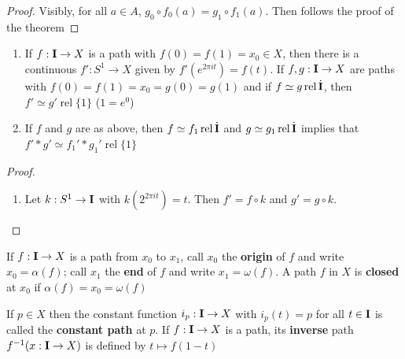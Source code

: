 \documentclass[11pt]{article}
\DeclareMathOperator{\rel}{\text{rel}}
\begin{document}
\begin{proof}
Visibly, for all \(a\in A\), \(g_0\circ f_0(a)=g_1\circ f_1(a)\). Then follows the proof of the theorem
\end{proof}

\begin{exercise}
\label{ex3.2}
\begin{enumerate}
\item If \(f:\operatorname{\textbf{I}}\to X\) is a path with \(f(0)=f(1)=x_0\in X\), then there is a continuous \(f':S^1\to X\)
given by \(f'(e^{2\pi it})=f(t)\). If \(f,g:\operatorname{\textbf{I}}\to X\) are paths with \(f(0)=f(1)=x_0=g(0)=g(1)\) and
if \(f\simeq g\rel\dbI\), then \(f'\simeq g'\rel\{1\}\) (\(1=e^0\))
\item If \(f\) and \(g\) are as above, then \(f\simeq f_1\rel\dbI\) and \(g\simeq g_1\rel\dbI\) implies
that \(f'*g'\simeq f_1'*g_1'\rel\{1\}\)
\end{enumerate}
\end{exercise}

\begin{proof}
\begin{enumerate}
\item Let \(k:S^1\to\operatorname{\textbf{I}}\) with \(k(2^{2\pi it})=t\). Then \(f'=f\circ k\) and \(g'=g\circ k\).
\end{enumerate}
\end{proof}

\begin{definition}[]
If \(f:\operatorname{\textbf{I}}\to X\) is a path from \(x_0\) to \(x_1\), call \(x_0\) the \textbf{origin} of \(f\) and
write \(x_0=\alpha(f)\); call \(x_1\) the \textbf{end} of \(f\) and write \(x_1=\omega(f)\). A path \(f\)  in \(X\) is
\textbf{closed} at \(x_0\) if \(\alpha(f)=x_0=\omega(f)\)
\end{definition}

\begin{definition}[]
If \(p\in X\) then the constant function \(i_p:\operatorname{\textbf{I}}\to X\) with \(i_p(t)=p\) for all \(t\in\operatorname{\textbf{I}}\) is called
the \textbf{constant path} at \(p\). If \(f:\operatorname{\textbf{I}}\to X\) is a path, its \textbf{inverse} path \(f^{-1}(x:\operatorname{\textbf{I}}\to X)\) is
defined by \(t\mapsto f(1-t)\)
\end{definition}
\end{document}
